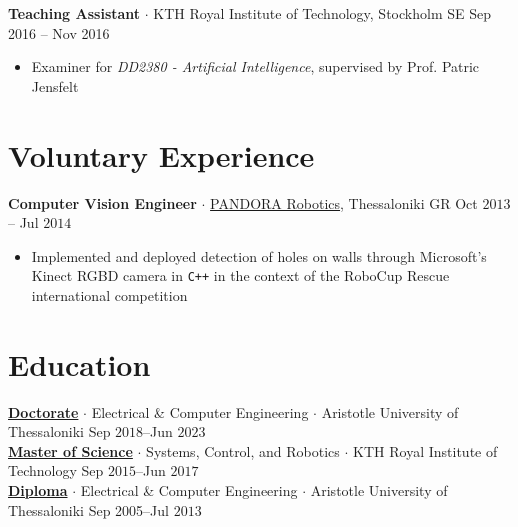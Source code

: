 \documentclass[a4paper,10pt,twoside]{article}
\begin{document}
  \textbf{Teaching Assistant} $\cdot$ KTH Royal Institute of Technology, Stockholm SE \hfill Sep 2016 -- Nov 2016 \\
  \begin{minipage}[t]{\textwidth}
    \begin{itemize}
      \item Examiner for \textit{DD2380 - Artificial Intelligence}, supervised by Prof. Patric Jensfelt
    \end{itemize}
  \end{minipage}

\section{Voluntary Experience}

\textbf{Computer Vision Engineer} $\cdot$ \href{https://issel.ee.auth.gr/pandora-robotics/}{PANDORA Robotics}, Thessaloniki GR \hfill Oct $2013$ -- Jul $2014$
  \begin{minipage}[t]{\textwidth}
    \begin{itemize}
      \item Implemented and deployed detection of holes on walls through Microsoft's Kinect RGBD camera in \texttt{C++} in the context of the RoboCup Rescue international competition
    \end{itemize}
  \end{minipage}

\section{Education}

\noindent \href{https://ikee.lib.auth.gr/record/354644}{\textbf{Doctorate}} $\cdot$ Electrical \& Computer Engineering $\cdot$ Aristotle University of Thessaloniki \hfill Sep $2018$--Jun $2023$ \\
\href{http://kth.diva-portal.org/smash/record.jsf?pid=diva2\%3A1102597\&dswid=2875}{\textbf{Master of Science}} $\cdot$ Systems, Control, and Robotics $\cdot$ KTH Royal Institute of Technology \hfill Sep $2015$--Jun $2017$ \\
\href{https://ikee.lib.auth.gr/record/291560}{\textbf{Diploma}} $\cdot$ Electrical \& Computer Engineering $\cdot$ Aristotle University of Thessaloniki \hfill Sep 2005--Jul $2013$
\end{document}
